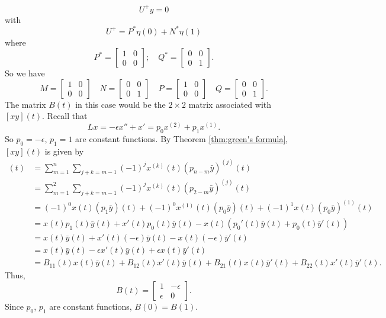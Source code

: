 \documentclass[11pt, oneside, a4paper]{article}
\begin{document}
\[U^+y=0\] with
\[U^+ = P^*\eta(0) + N^*\eta(1)\] where 
\[P^* = \begin{bmatrix} 1 & 0\\0 & 0 \end{bmatrix};\quad 
Q^* = \begin{bmatrix} 0 & 0\\ 0 & 1\end{bmatrix}.\]
So we have
\[M = \begin{bmatrix} 1 & 0\\0 & 0 \end{bmatrix} \quad 
N = \begin{bmatrix} 0 & 0\\ 0 & 1\end{bmatrix} \quad
P = \begin{bmatrix} 1 & 0\\0 & 0 \end{bmatrix} \quad 
Q = \begin{bmatrix} 0 & 0\\ 0 & 1\end{bmatrix}.\]
The matrix $B(t)$ in this case would be the $2\times 2$ matrix associated with $[xy](t)$. Recall that 
\[Lx = -\epsilon x'' + x'= p_0x^{(2)} + p_1x^{(1)}.\]
So $p_0=-\epsilon$, $p_1=1$ are constant functions.
By Theorem \ref{thm:green's formula}, $[xy](t)$ is given by
\begin{align*}
    [xy](t) &= \sum_{m=1}^n\sum_{j+k=m-1}(-1)^j x^{(k)}(t)(p_{n-m}\bar{y})^{(j)}(t)\\
    &= \sum_{m=1}^2\sum_{j+k=m-1}(-1)^j x^{(k)}(t)(p_{2-m}\bar{y})^{(j)}(t)\\
    &= (-1)^0x(t)(p_1\bar{y})(t) + (-1)^0x^{(1)}(t)(p_0\bar{y})(t) + (-1)^1x(t)(p_0\bar{y})^{(1)}(t)\\
    &= x(t)p_1(t)\bar{y}(t) + x'(t)p_0(t)\bar{y}(t) - x(t)(p_0'(t)\bar{y}(t) + p_0(t)\bar{y}'(t))\\
    &= x(t)\bar{y}(t) + x'(t)(-\epsilon)\bar{y}(t) - x(t)(-\epsilon)\bar{y}'(t)\\
    &= x(t)\bar{y}(t) - \epsilon x'(t)\bar{y}(t) + \epsilon x(t)\bar{y}'(t)\\
    &= B_{11}(t)x(t)\bar{y}(t) + B_{12}(t)x'(t)\bar{y}(t) + B_{21}(t)x(t)\bar{y}'(t) + B_{22}(t)x'(t)\bar{y}'(t).
\end{align*}
Thus,
\[
B(t) = \begin{bmatrix}
1 & -\epsilon\\
\epsilon & 0
\end{bmatrix}.
\]
Since $p_0$, $p_1$ are constant functions, $B(0)=B(1)$.
\end{document}
